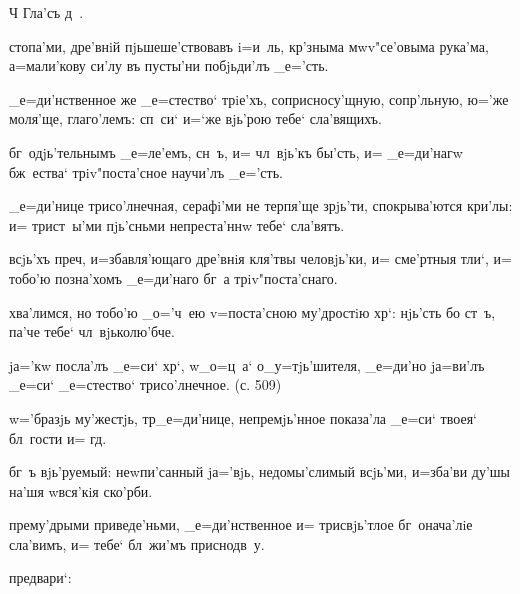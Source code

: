 
Ч%
Гла'съ д~.%


стопа'ми, дре'внiй пjьшеше'ствовавъ i=и~ль, 
кр'зныма мwv"се'овыма рука'ма, а=мали'кову си'лу 
въ пусты'ни побjьди'лъ _е='сть.

_е=ди'нственное же _е=стество` трiе'хъ, соприсносу'щную, 
сопр'льную, ю='же моля'ще, глаго'лемъ: сп~си` и=`же 
вjь'рою тебе` сла'вящихъ.

бг~одjь'тельнымъ _е=ле'емъ, сн~ъ, и= чл~вjь'къ бы'сть, и= 
_е=ди'нагw бж~ества` трiv"поста'сное научи'лъ _е='сть.

_е=ди'нице трисо'лнечная, серафi'ми не терпя'ще зрjь'ти, 
спокрыва'ются кри'лы: и= трист~ы'ми пjь'сньми 
непреста'ннw тебе` сла'вятъ.

всjь'хъ преч, и=збавля'ющаго дре'внiя кля'твы 
человjь'ки, и= сме'ртныя тли`, и= тобо'ю позна'хомъ 
_е=ди'наго бг~а трiv"поста'снаго.


хва'лимся, но тобо'ю _о='ч~ею v=поста'сною му'дростiю 
хр`: нjь'сть бо ст~ъ, па'че тебе` чл~вjьколю'бче.

jа='кw посла'лъ _е=си` хр`, w\т _о=ц~а` 
о_у=тjь'шителя, _е=ди'но jа=ви'лъ _е=си` _е=стество` 
трисо'лнечное. (с. 509)

w='бразjь му'жестjь, тр _е=ди'нице, непремjь'нное 
показа'ла _е=си` твоея` бл~гости и= гд.

бг~ъ вjь'руемый: неwпи'санный jа='вjь, недомы'слимый 
всjь'ми, и=зба'ви ду'шы на'шя w\т вся'кiя ско'рби.

прему'дрыми приведе'ньми, _е=ди'нственное и= трисвjь'тлое 
бг~онача'лiе сла'вимъ, и= тебе` бл~жи'мъ приснодв~у.

предвари`:

